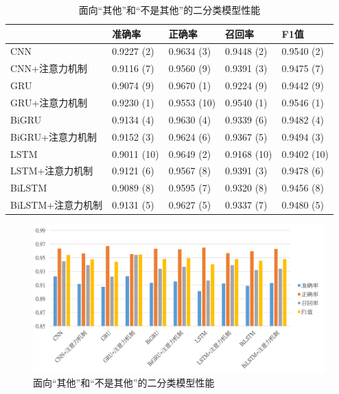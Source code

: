 \begin{table}[htb]
  \centering
  \begin{minipage}[t]{\linewidth}
  \caption{面向“其他”和“不是其他”的二分类模型性能}
  \label{tab:exp_context_emo_b_result}
    \begin{tabularx}{\linewidth}{X|llll}
    \toprule[1.5pt]
    & 准确率 & 正确率 & 召回率 & F1值 \\
    \hline
    CNN & 0.9227 (2) & 0.9634 (3) & 0.9448 (2) & 0.9540 (2) \\ %
    CNN+注意力机制 & 0.9116 (7) & 0.9560 (9) & 0.9391 (3) & 0.9475 (7) \\ %
    \hline
    GRU & 0.9074 (9) & 0.9670 (1) & 0.9224 (9) & 0.9442 (9) \\ %
    GRU+注意力机制 & 0.9230 (1) & 0.9553 (10) & 0.9540 (1) & 0.9546 (1) \\ %
    \hline
    BiGRU & 0.9134 (4) & 0.9630 (4) & 0.9339 (6) & 0.9482 (4) \\ %
    BiGRU+注意力机制 & 0.9152 (3) & 0.9624 (6) & 0.9367 (5) & 0.9494 (3) \\ %
    \hline
    LSTM & 0.9011 (10) & 0.9649 (2) & 0.9168 (10) & 0.9402 (10) \\ %
    LSTM+注意力机制 & 0.9121 (6) & 0.9567 (8) & 0.9391 (3) & 0.9478 (6) \\ %
    \hline
    BiLSTM & 0.9089 (8) & 0.9595 (7) & 0.9320 (8) & 0.9456 (8) \\ %
    BiLSTM+注意力机制 & 0.9131 (5) & 0.9627 (5) & 0.9337 (7) & 0.9480 (5) \\ %
    \bottomrule[1.5pt]
    \end{tabularx}
  \end{minipage}
\end{table}

\begin{figure}[H]
  \centering
  \includegraphics[width=\textwidth]{img/exp_context_emo_b_result_bar.png}
  \caption{面向“其他”和“不是其他”的二分类模型性能}
  \label{fig:exp_context_emo_b_result_bar}
\end{figure}

